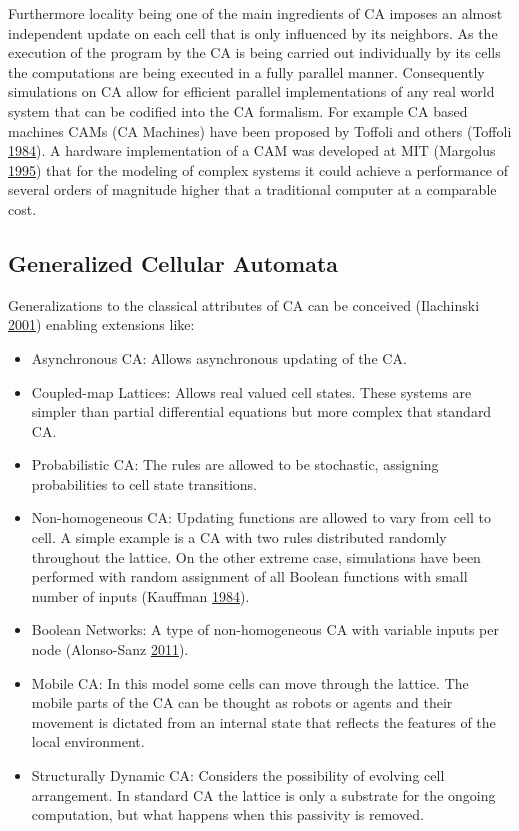 \documentclass[
]{book}
\begin{document}
Furthermore locality being one of the main ingredients of CA imposes an almost independent update on each cell that is only influenced by its neighbors. As the execution of the program by the CA is being carried out individually by its cells the computations are being executed in a fully parallel manner. Consequently simulations on CA allow for efficient parallel implementations of any real world system that can be codified into the CA formalism. For example CA based machines CAMs (CA Machines) have been proposed by Toffoli and others (Toffoli \protect\hyperlink{ref-toffoli1984cam}{1984}). A hardware implementation of a CAM was developed at MIT (Margolus \protect\hyperlink{ref-margolus1995cam}{1995}) that for the modeling of complex systems it could achieve a performance of several orders of magnitude higher that a traditional computer at a comparable cost.

\hypertarget{generalized-cellular-automata}{%
\subsection{Generalized Cellular Automata}\label{generalized-cellular-automata}}

Generalizations to the classical attributes of CA can be conceived (Ilachinski \protect\hyperlink{ref-ilachinski2001cellular}{2001}) enabling extensions like:

\begin{itemize}
\item
  Asynchronous CA:
  Allows asynchronous updating of the CA.
\item
  Coupled-map Lattices:
  Allows real valued cell states. These systems are simpler than partial differential equations but more complex that standard CA.
\item
  Probabilistic CA:
  The rules are allowed to be stochastic, assigning probabilities to cell state transitions.
\item
  Non-homogeneous CA:
  Updating functions are allowed to vary from cell to cell. A simple example is a CA with two rules distributed randomly throughout the lattice. On the other extreme case, simulations have been performed with random assignment of all Boolean functions with small number of inputs (Kauffman \protect\hyperlink{ref-kauffman1984emergent}{1984}).
\item
  Boolean Networks:
  A type of non-homogeneous CA with variable inputs per node (Alonso-Sanz \protect\hyperlink{ref-alonso2011discrete}{2011}).
\item
  Mobile CA:
  In this model some cells can move through the lattice. The mobile parts of the CA can be thought as robots or agents and their movement is dictated from an internal state that reflects the features of the local environment.
\item
  Structurally Dynamic CA:
  Considers the possibility of evolving cell arrangement. In standard CA the lattice is only a substrate for the ongoing computation, but what happens when this passivity is removed.
\end{itemize}
\end{document}
